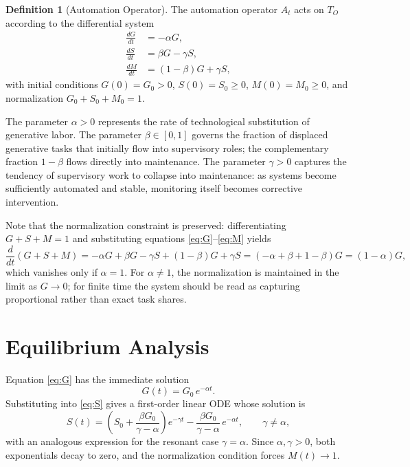 \documentclass[12pt,a4paper]{article}
\theoremstyle{plain}
\theoremstyle{definition}
\newtheorem{definition}[theorem]{Definition}
\theoremstyle{remark}
\begin{document}
\begin{definition}[Automation Operator]
The automation operator $A_t$ acts on $T_O$ according to the differential
system
\begin{align}
\frac{dG}{dt} &= -\alpha G, \label{eq:G}\\[4pt]
\frac{dS}{dt} &= \beta G - \gamma S, \label{eq:S}\\[4pt]
\frac{dM}{dt} &= (1-\beta)G + \gamma S, \label{eq:M}
\end{align}
with initial conditions $G(0) = G_0 > 0$, $S(0) = S_0 \geq 0$,
$M(0) = M_0 \geq 0$, and normalization $G_0 + S_0 + M_0 = 1$.
\end{definition}

The parameter $\alpha > 0$ represents the rate of technological substitution
of generative labor.  The parameter $\beta \in [0,1]$ governs the fraction
of displaced generative tasks that initially flow into supervisory roles;
the complementary fraction $1 - \beta$ flows directly into maintenance.
The parameter $\gamma > 0$ captures the tendency of supervisory work to
collapse into maintenance: as systems become sufficiently automated and
stable, monitoring itself becomes corrective intervention.

Note that the normalization constraint is preserved: differentiating
$G + S + M = 1$ and substituting equations \eqref{eq:G}--\eqref{eq:M} yields
\[
\frac{d}{dt}(G + S + M) = -\alpha G + \beta G - \gamma S + (1-\beta)G + \gamma S
= (-\alpha + \beta + 1 - \beta)G = (1-\alpha)G,
\]
which vanishes only if $\alpha = 1$.  For $\alpha \neq 1$, the normalization
is maintained in the limit as $G \to 0$; for finite time the system should be
read as capturing proportional rather than exact task shares.

\section{Equilibrium Analysis}
\label{sec:equilibrium}

Equation \eqref{eq:G} has the immediate solution
\[
G(t) = G_0\, e^{-\alpha t}.
\]
Substituting into \eqref{eq:S} gives a first-order linear ODE whose solution is
\[
S(t) = \left(S_0 + \frac{\beta G_0}{\gamma - \alpha}\right)e^{-\gamma t}
        - \frac{\beta G_0}{\gamma - \alpha}\,e^{-\alpha t},
\qquad \gamma \neq \alpha,
\]
with an analogous expression for the resonant case $\gamma = \alpha$.  Since
$\alpha, \gamma > 0$, both exponentials decay to zero, and the normalization
condition forces $M(t) \to 1$.
\end{document}
